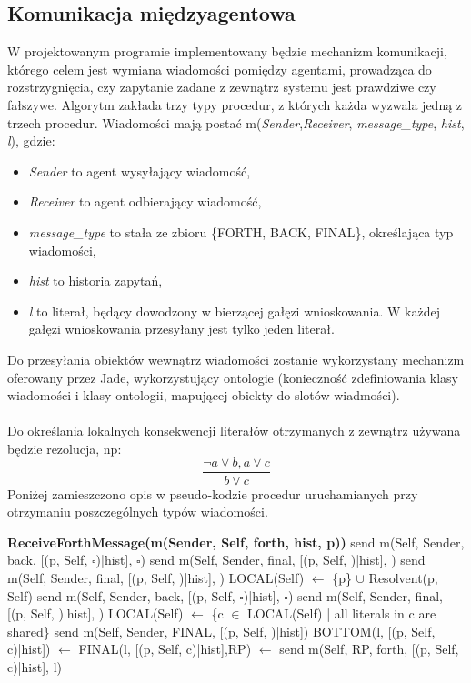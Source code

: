 \documentclass[a4paper,12pt]{mwart}
\begin{document}
\subsection{Komunikacja międzyagentowa}
W projektowanym programie implementowany będzie mechanizm komunikacji, którego celem jest wymiana wiadomości pomiędzy agentami, prowadząca do rozstrzygnięcia, czy zapytanie zadane z zewnątrz systemu jest prawdziwe czy fałszywe.
Algorytm zakłada trzy typy procedur, z których każda wyzwala jedną z trzech procedur. Wiadomości mają postać m(\textit{Sender},\textit{Receiver}, \textit{message\_type}, \textit{hist}, \textit{l}), gdzie:
\begin{itemize}
\item \textit{Sender} to agent wysyłający wiadomość,
\item \textit{Receiver} to agent odbierający wiadomość,
\item \textit{message\_type} to stała ze zbioru \{FORTH, BACK, FINAL\}, określająca typ wiadomości,
\item \textit{hist} to historia zapytań,
\item \textit{l} to literał, będący dowodzony w bierzącej gałęzi wnioskowania. W każdej gałęzi wnioskowania przesyłany jest tylko jeden literał.
\end{itemize}
Do przesyłania obiektów wewnątrz wiadomości zostanie wykorzystany mechanizm oferowany przez Jade, wykorzystujący ontologie (konieczność zdefiniowania klasy wiadomości i klasy ontologii, mapującej obiekty do slotów wiadmości). 
\\\\
Do określania lokalnych konsekwencji literałów otrzymanych z zewnątrz używana będzie rezolucja, np:
\begin{equation}
\frac{\neg a \vee b, a \vee c}{b \vee c}
\end{equation}
Poniżej zamieszczono opis w pseudo-kodzie procedur uruchamianych przy otrzymaniu poszczególnych typów wiadomości.
\begin{algorithm}[H]
\begin{algorithmic}
\STATE \textbf{ReceiveForthMessage(m(Sender, Self, forth, hist, p))}
\STATE send m(Self, Sender, back, [(p, Self, $\square$)|hist], $\square$)
\STATE send m(Self, Sender, final, [(p, Self, \TRUE)|hist], \TRUE)
\STATE send m(Self, Sender, final, [(p, Self, \TRUE)|hist], \TRUE)
\ELSE
\STATE LOCAL(Self) $\leftarrow$ \{p\} $\cup$ Resolvent(p, Self)
\STATE send m(Self, Sender, back, [(p, Self, $\square$)|hist], $\square$)
\STATE send m(Self, Sender, final, [(p, Self, \TRUE)|hist], \TRUE)
\ELSE
\STATE LOCAL(Self) $\leftarrow$ \{c $\in$ LOCAL(Self) | all literals in c are shared\}
\STATE send m(Self, Sender, FINAL, [(p, Self, \TRUE)|hist])
\ENDIF
{}
\STATE BOTTOM(l, [(p, Self, c)|hist]) $\leftarrow$ \FALSE
{}
\STATE FINAL(l, [(p, Self, c)|hist],RP) $\leftarrow$ \FALSE
\STATE send m(Self, RP, forth, [(p, Self, c)|hist], l)
\ENDFOR
\ENDFOR
\ENDFOR
\ENDIF
\ENDIF
\end{algorithmic}
\end{algorithm}
\end{document}
